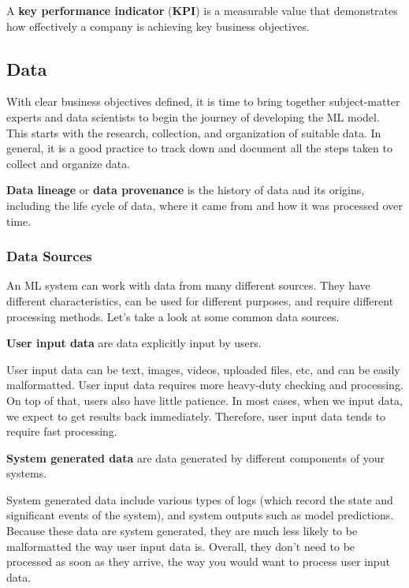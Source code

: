 A \textbf{key performance indicator} (\textbf{KPI}) is a measurable value that demonstrates how effectively a company
is achieving key business objectives.
\ed

\subsection{Data}

With clear business objectives defined, it is time to bring together subject-matter experts and data scientists to
begin the journey of developing the ML model. This starts with the research, collection, and organization of suitable
data. In general, it is a good practice to track down and document all the steps taken to collect and organize data.

\textbf{Data lineage} or \textbf{data provenance} is the history of data and its origins, including the life cycle of
data, where it came from and how it was processed over time.
\ed

\subsubsection{Data Sources}

An ML system can work with data from many different sources. They have different characteristics, can be used for
different purposes, and require different processing methods. Let's take a look at some common data sources.

\textbf{User input data} are data explicitly input by users.
\ed

User input data can be text, images, videos, uploaded files, etc, and can be easily malformatted. User input data
requires more heavy-duty checking and processing. On top of that, users also have little patience. In most cases,
when we input data, we expect to get results back immediately. Therefore, user input data tends to require fast
processing.

\textbf{System generated data} are data generated by different components of your systems.
\ed

System generated data include various types of logs (which record the state and significant events of the system),
and system outputs such as model predictions. Because these data are system generated, they are much less likely to
be malformatted the way user input data is. Overall, they don't need to be processed as soon as they arrive, the way
you would want to process user input data.

